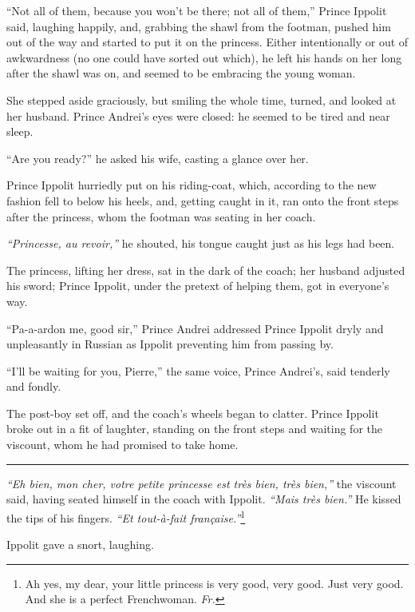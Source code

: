 ``Not all of them, because you won't be there; not all of them,'' Prince Ippolit said, laughing happily, and, grabbing the shawl from the footman, pushed him out of the way and started to put it on the princess. Either intentionally or out of awkwardness (no one could have sorted out which), he left his hands on her long after the shawl was on, and seemed to be embracing the young woman. 

She stepped aside graciously, but smiling the whole time, turned, and looked at her husband. Prince Andrei's eyes were closed: he seemed to be tired and near sleep.

``Are you ready?'' he asked his wife, casting a glance over her. %

Prince Ippolit hurriedly put on his riding-coat, which, according to the new fashion fell to below his heels, and, getting caught in it, ran onto the front steps after the princess, whom the footman was seating in her coach.

\textit{``Princesse, au revoir,''} he shouted, his tongue caught just as his legs had been.

The princess, lifting her dress, sat in the dark of the coach; her husband adjusted his sword; Prince Ippolit, under the pretext of helping them, got in everyone's way.

``Pa-a-ardon me, good sir,'' Prince Andrei addressed Prince Ippolit dryly and unpleasantly in Russian as Ippolit preventing him from passing by. %

``I'll be waiting for you, Pierre,'' the same voice, Prince Andrei's, said tenderly and fondly. %

The post-boy set off, and the coach's wheels began to clatter. Prince Ippolit broke out in a fit of laughter, standing on the front steps and waiting for the viscount, whom he had promised to take home.

\begin{center}
	\rule{5em}{0.4pt}
\end{center}

\textit{``Eh bien, mon cher, votre petite princesse est tr\`es bien, tr\`es bien,''} the viscount said, having seated himself in the coach with Ippolit. \textit{``Mais tr\`es bien.''} He kissed the tips of his fingers. \textit{``Et tout-\`a-fait fran\c caise.''}\footnote{Ah yes, my dear, your little princess is very good, very good. Just very good. And she is a perfect Frenchwoman. \textit{Fr.}} %

Ippolit gave a snort, laughing.

